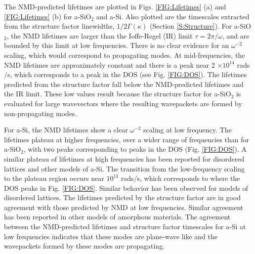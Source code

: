 \documentclass[aps,prb,twocolumn,superscriptaddress,footinbib,amsmath,amssymb,floatfix]{revtex4}
\begin{document}
The NMD-predicted lifetimes are plotted in Figs. \ref{FIG:Lifetimes} 
(a) and \ref{FIG:Lifetimes} (b) 
for a-SiO$_2$ and a-Si. 
Also plotted are the timescales extracted from the structure 
factor linewidths, $1/2\Gamma(\kappa)$ (Section \ref{S:Structure}). 
For a-SiO$_2$, the NMD lifetimes are larger than 
the Ioffe-Regel (IR) limit $\tau = 2\pi/\omega$,
\cite{taraskin_determination_1999} and are bounded by  
this limit at low frequencies. There is no clear evidence for an 
$\omega^{-2}$ scaling, which would correspond to propagating modes.  
At mid-frequencies, the NMD lifetimes are approximately constant and  
there is a peak near 2 $\times 10^{14}$ rads$/$s, which corresponds to 
a peak in the DOS (see Fig. \ref{FIG:DOS}). 
The lifetimes predicted from the 
structure factor fall below the NMD-predicted lifetimes 
and the IR limit. These low values result because the structure factor 
for a-SiO$_2$ is evaluated for large wavevectors where the resulting 
wavepackets are formed by non-propagating modes.
\cite{feldman_thermal_1993,feldman_numerical_1999,allen_diffusons_1999}

For a-Si, the NMD lifetimes show a clear $\omega^{-2}$ 
scaling at low frequency. 
The lifetimes plateau at higher frequencies,
over a wider range of frequencies than for a-SiO$_2$, with two peaks 
corresponding to peaks in the DOS (Fig. \ref{FIG:DOS}). A similar 
plateau of lifetimes at high frequencies has been 
reported for disordered lattices
\cite{sheng_heat_1991,he_lattice_2012,larkin_predicting_2013} and 
other models of a-Si.\cite{he_heat_2011} 
The transition from the low-frequency scaling to 
the plateau region occurs near 
$10^{13}$ rads$/$s, which corresponds to where the DOS peaks in Fig. 
\ref{FIG:DOS}. 
Similar behavior has been observed for models of disordered lattices.
\cite{larkin_predicting_2013} The lifetimes predicted by the 
structure factor are in good agreement with those predicted by NMD 
at low frequencies. Similar agreement has been reported in other 
models of amorphous materials.
\cite{mazzacurati_low-frequency_1996,bickham_calculation_1998,
bickham_numerical_1999,feldman_numerical_1999} 
The agreement between the 
NMD-predicted lifetimes and structure factor timescales for a-Si at 
low frequencies indicates that these modes are plane-wave like 
and the wavepackets formed by these modes are propagating.
\cite{feldman_thermal_1993,feldman_numerical_1999,allen_diffusons_1999}
\end{document}

